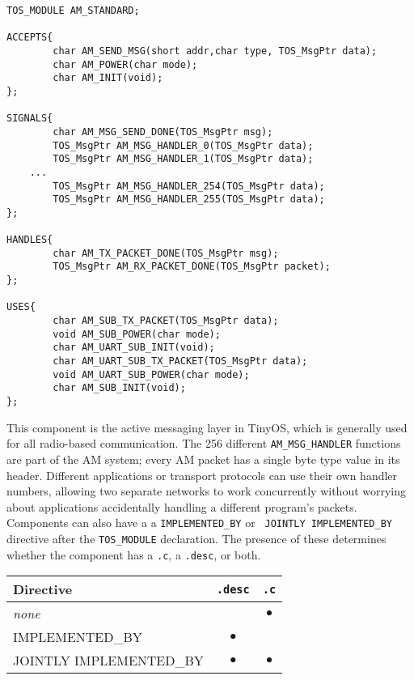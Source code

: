 \documentclass[12pt]{article}
\begin{document}
\begin{verbatim}
TOS_MODULE AM_STANDARD;

ACCEPTS{
        char AM_SEND_MSG(short addr,char type, TOS_MsgPtr data);
        char AM_POWER(char mode);
        char AM_INIT(void);
};

SIGNALS{ 
        char AM_MSG_SEND_DONE(TOS_MsgPtr msg);
        TOS_MsgPtr AM_MSG_HANDLER_0(TOS_MsgPtr data);
        TOS_MsgPtr AM_MSG_HANDLER_1(TOS_MsgPtr data);
	...
        TOS_MsgPtr AM_MSG_HANDLER_254(TOS_MsgPtr data);
        TOS_MsgPtr AM_MSG_HANDLER_255(TOS_MsgPtr data);
};

HANDLES{
        char AM_TX_PACKET_DONE(TOS_MsgPtr msg);
        TOS_MsgPtr AM_RX_PACKET_DONE(TOS_MsgPtr packet);
};

USES{
        char AM_SUB_TX_PACKET(TOS_MsgPtr data);
        void AM_SUB_POWER(char mode);
        char AM_UART_SUB_INIT(void);
        char AM_UART_SUB_TX_PACKET(TOS_MsgPtr data);
        void AM_UART_SUB_POWER(char mode);
        char AM_SUB_INIT(void);
};
\end{verbatim}

This component is the active messaging layer in TinyOS, which is
generally used for all radio-based communication. The 256 different
{\tt AM\_MSG\_HANDLER} functions are part of the AM system; every AM
packet has a single byte type value in its header. Different
applications or transport protocols can use their own handler numbers,
allowing two separate networks to work concurrently without worrying
about applications accidentally handling a different program's
packets. Components can also have a a {\tt IMPLEMENTED\_BY} or {\tt
JOINTLY IMPLEMENTED\_BY} directive after the {\tt TOS\_MODULE}
declaration. The presence of these determines whether the component
has a {\tt .c}, a {\tt .desc}, or both.

\begin{center}
\vspace{0.2cm}
\begin{tabular}{|l|c|c|}\hline
Directive & {\tt .desc} & {\tt .c} \\ \hline
{\it none} & & $\bullet$ \\ \hline
IMPLEMENTED\_BY &  $\bullet$ & \\ \hline
JOINTLY IMPLEMENTED\_BY &  $\bullet$ & $\bullet$ \\ \hline
\end{tabular}
\vspace{0.2cm}
\end{center}
\end{document}
